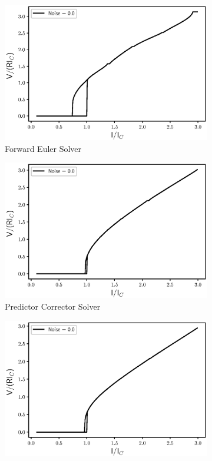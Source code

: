\documentclass{thesis}
\begin{document}
\begin{figure}[H]
    \centering
    \begin{subfigure}[b]{0.32\textwidth}
        \centering
        \includegraphics[width=\textwidth]{images/Q_1FE.eps}
        \caption{Forward Euler Solver}
    \end{subfigure}
    \hfill
    \begin{subfigure}[b]{0.32\textwidth}
        \centering
        \includegraphics[width=\textwidth]{images/Q_1PC.eps}
        \caption{Predictor Corrector Solver}
    \end{subfigure}
    \hfill
    \begin{subfigure}[b]{0.32\textwidth}
        \centering
        \includegraphics[width=\textwidth]{images/Q_1RK.eps}

\end{subfigure}
\end{figure}
\end{document}
